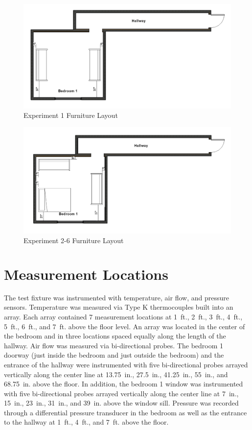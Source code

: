 \documentclass[12pt,oneside]{book}
\begin{document}
\begin{figure}[H]
	\centering
	\includegraphics[width=\textwidth]{Figures/Furniture/Exp1FurnitureDimensions.png}
	\caption{Experiment 1 Furniture Layout}
	\label{fig:Exp1FurnitureDim}
\end{figure}

\begin{figure}[H]
	\centering
	\includegraphics[width=\textwidth]{Figures/Furniture/Exp2to6FurnitureDimensions.png}
	\caption{Experiment 2-6 Furniture Layout}
	\label{fig:Exp2to6FurnitureDim}
\end{figure}

\section*{Measurement Locations}

The test fixture was instrumented with temperature, air flow, and pressure sensors. Temperature was measured via Type K thermocouples built into an array. Each array contained 7 measurement locations at 1~ft., 2~ft., 3~ft., 4~ft., 5~ft., 6~ft., and 7~ft. above the floor level. An array was located in the center of the bedroom and in three locations spaced equally along the length of the hallway. Air flow was measured via bi-directional probes. The bedroom 1 doorway (just inside the bedroom and just outside the bedroom) and the entrance of the hallway were instrumented with five bi-directional probes arrayed vertically along the center line at 13.75~in., 27.5~in., 41.25~in., 55~in., and 68.75~in. above the floor. In addition, the bedroom 1 window was instrumented with five bi-directional probes arrayed vertically along the center line at 7~in., 15~in., 23~in., 31~in., and 39~in. above the window sill. Pressure was recorded through a differential pressure transducer in the bedroom as well as the entrance to the hallway at 1~ft., 4~ft., and 7~ft. above the floor. 
\end{document}
